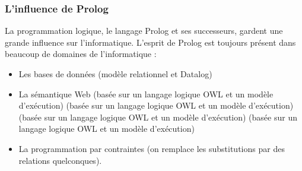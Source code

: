 \subsubsection{L'influence de Prolog}

La programmation logique, le langage Prolog et ses successeurs,
gardent une grande influence sur l'informatique.
L'esprit de Prolog est toujours présent
dans beaucoup de domaines de l'informatique :
\begin{itemize}
\item Les bases de données (modèle relationnel et Datalog)
\item La sémantique Web (basée sur un langage logique OWL et un modèle d'exécution) (basée sur un langage logique OWL et un modèle d'exécution) (basée sur un langage logique OWL et un modèle d'exécution) (basée sur un langage logique OWL et un modèle d'exécution)
\item La programmation par contraintes (on remplace les substitutions par des relations quelconques).
\end{itemize}

